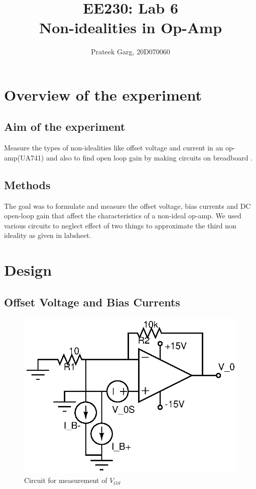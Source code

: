 \documentclass[12pt]{article}
\title{EE230: Lab 6\\
Non-idealities in Op-Amp}
\author{Prateek Garg, 20D070060}
\begin{document}
\maketitle

\section{Overview of the experiment}
\subsection{Aim of the experiment}
Measure the types of non-idealities like offset voltage and 
current in an op-amp(UA741) and also to find open loop gain by making circuits on breadboard .

\subsection{Methods}
The goal was to formulate and measure the offset voltage, bias currents and DC open-loop gain
 that affect the characteristics of a non-ideal op-amp. We used various circuits to neglect effect 
 of two things to approximate the third non ideality as given in labsheet.

\newpage

 \section{Design}


 \subsection{Offset Voltage and Bias Currents}

\begin{figure}[H]
    \centering
    \includegraphics[scale=1]{fig2.eps}
    \caption{Circuit for measurement of $V_{OS}$}
    \label{fig:1a}
\end{figure}
\end{document}
